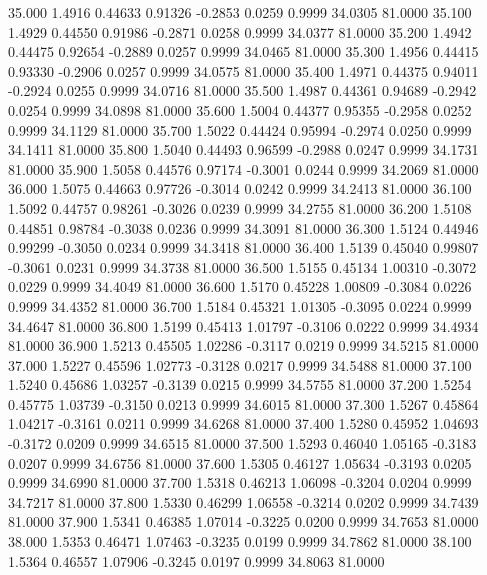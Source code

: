   35.000   1.4916   0.44633   0.91326  -0.2853   0.0259   0.9999  34.0305  81.0000
  35.100   1.4929   0.44550   0.91986  -0.2871   0.0258   0.9999  34.0377  81.0000
  35.200   1.4942   0.44475   0.92654  -0.2889   0.0257   0.9999  34.0465  81.0000
  35.300   1.4956   0.44415   0.93330  -0.2906   0.0257   0.9999  34.0575  81.0000
  35.400   1.4971   0.44375   0.94011  -0.2924   0.0255   0.9999  34.0716  81.0000
  35.500   1.4987   0.44361   0.94689  -0.2942   0.0254   0.9999  34.0898  81.0000
  35.600   1.5004   0.44377   0.95355  -0.2958   0.0252   0.9999  34.1129  81.0000
  35.700   1.5022   0.44424   0.95994  -0.2974   0.0250   0.9999  34.1411  81.0000
  35.800   1.5040   0.44493   0.96599  -0.2988   0.0247   0.9999  34.1731  81.0000
  35.900   1.5058   0.44576   0.97174  -0.3001   0.0244   0.9999  34.2069  81.0000
  36.000   1.5075   0.44663   0.97726  -0.3014   0.0242   0.9999  34.2413  81.0000
  36.100   1.5092   0.44757   0.98261  -0.3026   0.0239   0.9999  34.2755  81.0000
  36.200   1.5108   0.44851   0.98784  -0.3038   0.0236   0.9999  34.3091  81.0000
  36.300   1.5124   0.44946   0.99299  -0.3050   0.0234   0.9999  34.3418  81.0000
  36.400   1.5139   0.45040   0.99807  -0.3061   0.0231   0.9999  34.3738  81.0000
  36.500   1.5155   0.45134   1.00310  -0.3072   0.0229   0.9999  34.4049  81.0000
  36.600   1.5170   0.45228   1.00809  -0.3084   0.0226   0.9999  34.4352  81.0000
  36.700   1.5184   0.45321   1.01305  -0.3095   0.0224   0.9999  34.4647  81.0000
  36.800   1.5199   0.45413   1.01797  -0.3106   0.0222   0.9999  34.4934  81.0000
  36.900   1.5213   0.45505   1.02286  -0.3117   0.0219   0.9999  34.5215  81.0000
  37.000   1.5227   0.45596   1.02773  -0.3128   0.0217   0.9999  34.5488  81.0000
  37.100   1.5240   0.45686   1.03257  -0.3139   0.0215   0.9999  34.5755  81.0000
  37.200   1.5254   0.45775   1.03739  -0.3150   0.0213   0.9999  34.6015  81.0000
  37.300   1.5267   0.45864   1.04217  -0.3161   0.0211   0.9999  34.6268  81.0000
  37.400   1.5280   0.45952   1.04693  -0.3172   0.0209   0.9999  34.6515  81.0000
  37.500   1.5293   0.46040   1.05165  -0.3183   0.0207   0.9999  34.6756  81.0000
  37.600   1.5305   0.46127   1.05634  -0.3193   0.0205   0.9999  34.6990  81.0000
  37.700   1.5318   0.46213   1.06098  -0.3204   0.0204   0.9999  34.7217  81.0000
  37.800   1.5330   0.46299   1.06558  -0.3214   0.0202   0.9999  34.7439  81.0000
  37.900   1.5341   0.46385   1.07014  -0.3225   0.0200   0.9999  34.7653  81.0000
  38.000   1.5353   0.46471   1.07463  -0.3235   0.0199   0.9999  34.7862  81.0000
  38.100   1.5364   0.46557   1.07906  -0.3245   0.0197   0.9999  34.8063  81.0000
